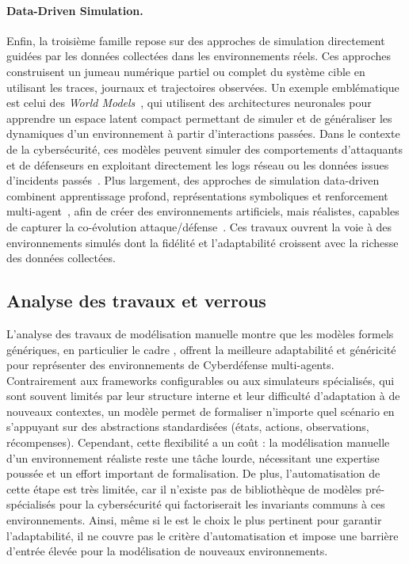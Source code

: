 \paragraph{Data-Driven Simulation.}
Enfin, la troisième famille repose sur des approches de simulation directement guidées par les données collectées dans les environnements réels. Ces approches construisent un jumeau numérique partiel ou complet du système cible en utilisant les traces, journaux et trajectoires observées. Un exemple emblématique est celui des \textit{World Models}~\cite{Ha2018}, qui utilisent des architectures neuronales pour apprendre un espace latent compact permettant de simuler et de généraliser les dynamiques d'un environnement à partir d'interactions passées. Dans le contexte de la cybersécurité, ces modèles peuvent simuler des comportements d'attaquants et de défenseurs en exploitant directement les logs réseau ou les données issues d'incidents passés~\cite{D2mbiT0vgP4J}. Plus largement, des approches de simulation data-driven combinent apprentissage profond, représentations symboliques et renforcement multi-agent~\cite{5oUSbVbTXX0J, RQyw5NYMj-wJ}, afin de créer des environnements artificiels, mais réalistes, capables de capturer la co-évolution attaque/défense~\cite{oOfK6FXUSCAJ}. Ces travaux ouvrent la voie à des environnements simulés dont la fidélité et l'adaptabilité croissent avec la richesse des données collectées.

\subsection*{Analyse des travaux et verrous}

L'analyse des travaux de modélisation manuelle montre que les modèles formels génériques, en particulier le cadre , offrent la meilleure adaptabilité et généricité pour représenter des environnements de Cyberdéfense multi-agents. Contrairement aux frameworks configurables ou aux simulateurs spécialisés, qui sont souvent limités par leur structure interne et leur difficulté d'adaptation à de nouveaux contextes, un modèle  permet de formaliser n'importe quel scénario en s'appuyant sur des abstractions standardisées (états, actions, observations, récompenses). Cependant, cette flexibilité a un coût : la modélisation manuelle d'un environnement réaliste reste une tâche lourde, nécessitant une expertise poussée et un effort important de formalisation. De plus, l'automatisation de cette étape est très limitée, car il n'existe pas de bibliothèque de modèles  pré-spécialisés pour la cybersécurité qui factoriserait les invariants communs à ces environnements. Ainsi, même si le  est le choix le plus pertinent pour garantir l'adaptabilité, il ne couvre pas le critère d'automatisation et impose une barrière d'entrée élevée pour la modélisation de nouveaux environnements.

